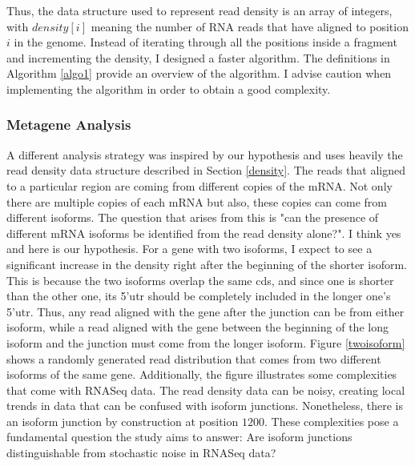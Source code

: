 \documentclass[12pt]{article}
\begin{document}
Thus, the data structure used to represent read density is an array of integers, with $density[i]$ meaning the number of RNA reads that have aligned to position $i$ in the genome. Instead of iterating through all the positions inside a fragment and incrementing the density, I designed a faster algorithm. The definitions in Algorithm \ref{algo1} provide an overview of the algorithm. I advise caution when implementing the algorithm in order to obtain a good complexity.







\subsubsection{Metagene Analysis}\label{metagene_sect}
A different analysis strategy was inspired by our hypothesis and uses heavily the read density data structure described in Section \ref{density}. The reads that aligned to a particular region are coming from different copies of the mRNA. Not only there are multiple copies of each mRNA but also, these copies can come from different isoforms. The question that arises from this is "can the presence of different mRNA isoforms be identified from the read density alone?". I think yes and here is our hypothesis. For a gene with two isoforms, I expect to see a significant increase in the density right after the beginning of the shorter isoform. This is because the two isoforms overlap the same \acrshort{cds}, and since one is shorter than the other one, its 5'\acrshort{utr} should be completely included in the longer one's 5'\acrshort{utr}. Thus, any read aligned with the gene after the junction can be from either isoform, while a read aligned with the gene between the beginning of the long isoform and the junction must come from the longer isoform. Figure \ref{twoisoform} shows a randomly generated read distribution that comes from two different isoforms of the same gene. Additionally, the figure illustrates some complexities that come with RNASeq data. The read density data can be noisy, creating local trends in data that can be confused with isoform junctions. Nonetheless, there is an isoform junction by construction at position $1200$. These complexities pose a fundamental question the study aims to answer: Are isoform junctions distinguishable from stochastic noise in RNASeq data?


\end{document}
